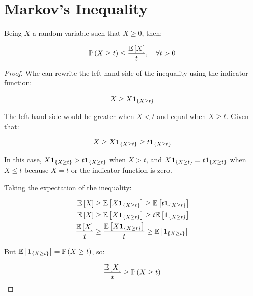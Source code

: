 \section{Markov's Inequality}

Being $X$ a random variable such that $X \geq 0$, then:

\begin{equation*}
\mathbb{P}\left(X \geq t\right) \leq \frac{\mathbb{E}\left[X\right]}{t}, \quad \forall t > 0
\end{equation*}

\begin{proof}
Whe can rewrite the left-hand side of the inequality using the indicator function:

\begin{align*}
X \geq X \mathbf{1}_{\{X \geq t\}}
\end{align*}

The left-hand side would be greater when $X < t$ and equal when $X \geq t$. Given that:

\begin{align*}
X \geq X \mathbf{1}_{\{X \geq t\}} \geq t \mathbf{1}_{\{X \geq t\}}
\end{align*}

In this case, $X \mathbf{1}_{\{X \geq t\}} > t \mathbf{1}_{\{X \geq t\}}$ when $X > t$, and $X \mathbf{1}_{\{X \geq t\}} = t \mathbf{1}_{\{X \geq t\}}$ when $X \leq t$ because $X = t$ or the indicator function is zero.

Taking the expectation of the inequality:

\begin{align*}
\mathbb{E}\left[X\right] &\geq \mathbb{E}\left[X \mathbf{1}_{\{X \geq t\}}\right] \geq \mathbb{E}\left[t \mathbf{1}_{\{X \geq t\}}\right] \\
\mathbb{E}\left[X\right] &\geq \mathbb{E}\left[X \mathbf{1}_{\{X \geq t\}}\right] \geq t \mathbb{E}\left[\mathbf{1}_{\{X \geq t\}}\right] \\
\frac{\mathbb{E}\left[X\right]}{t} &\geq \frac{\mathbb{E}\left[X \mathbf{1}_{\{X \geq t\}}\right]}{t} \geq \mathbb{E}\left[\mathbf{1}_{\{X \geq t\}}\right] \\
\end{align*}

But $\mathbb{E}\left[\mathbf{1}_{\{X \geq t\}}\right] = \mathbb{P}\left(X \geq t\right)$, so:

\begin{align*}
\frac{\mathbb{E}\left[X\right]}{t} &\geq \mathbb{P}\left(X \geq t\right) \\
\end{align*}

\end{proof}